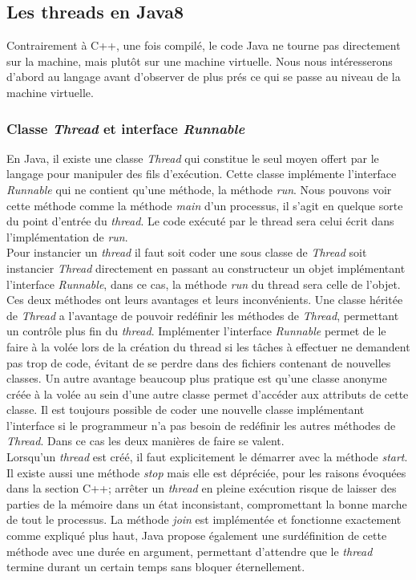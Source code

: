 \documentclass[a4paper,twoside,10pt,english,french,twocolumn]{article}
\theoremstyle{definition}
\theoremstyle{remark}
\theoremstyle{plain}
\begin{document}
\subsection{Les threads en Java8}
Contrairement à C++, une fois compilé, le code Java ne tourne pas directement sur la machine, mais plutôt sur une machine virtuelle. Nous nous intéresserons d'abord au langage avant d'observer de plus prés ce qui se passe au niveau de la machine virtuelle.
\subsubsection*{Classe \textit{Thread} et interface \textit{Runnable}}
En Java, il existe une classe \textit{Thread} qui constitue le seul moyen offert par le langage pour manipuler des fils d'exécution. Cette classe implémente l'interface \textit{Runnable} qui ne contient qu'une méthode, la méthode \textit{run}. Nous pouvons voir cette méthode comme la méthode \textit{main} d'un processus, il s'agit en quelque sorte du point d'entrée du \textit{thread}. Le code exécuté par le thread sera celui écrit dans l'implémentation de \textit{run}.\\
Pour instancier un \textit{thread} il faut soit coder une sous classe de \textit{Thread} soit instancier \textit{Thread} directement en passant au constructeur un objet implémentant l'interface \textit{Runnable}, dans ce cas, la méthode \textit{run} du thread sera celle de l'objet. Ces deux méthodes ont leurs avantages et leurs inconvénients. Une classe héritée de \textit{Thread} a l'avantage de pouvoir redéfinir les méthodes de \textit{Thread}, permettant un contrôle plus fin du \textit{thread}. Implémenter l'interface \textit{Runnable} permet de le faire à la volée lors de la création du thread si les tâches à effectuer ne demandent pas trop de code, évitant de se perdre dans des fichiers contenant de nouvelles classes. Un autre avantage beaucoup plus pratique est qu'une classe anonyme créée à la volée au sein d'une autre classe permet d'accéder aux attributs de cette classe. Il est toujours possible de coder une nouvelle classe implémentant l'interface si le programmeur n'a pas besoin de redéfinir les autres méthodes de \textit{Thread}. Dans ce cas les deux manières de faire se valent.\\
Lorsqu'un \textit{thread} est créé, il faut explicitement le démarrer avec la méthode \textit{start}. Il existe aussi une méthode \textit{stop} mais elle est dépréciée, pour les raisons évoquées dans la section C++; arrêter un \textit{thread} en pleine exécution risque de laisser des parties de la mémoire dans un état inconsistant, compromettant la bonne marche de tout le processus. La méthode \textit{join} est implémentée et fonctionne exactement comme expliqué plus haut, Java propose également une surdéfinition de cette méthode avec une durée en argument, permettant d'attendre que le \textit{thread} termine durant un certain temps sans bloquer éternellement.
\end{document}
